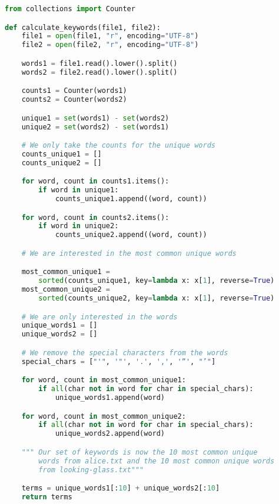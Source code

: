\documentclass{article}
\begin{document}
\begin{center}
\begin{minipage}{0.8\linewidth}
\begin{lstlisting}[language=Python]
from collections import Counter

def calculate_keywords(file1, file2):
    file1 = open(file1, "r", encoding="UTF-8")
    file2 = open(file2, "r", encoding="UTF-8")

    words1 = file1.read().lower().split()
    words2 = file2.read().lower().split()

    counts1 = Counter(words1)
    counts2 = Counter(words2)

    unique1 = set(words1) - set(words2)
    unique2 = set(words2) - set(words1)

    # We only take the counts for the unique words
    counts_unique1 = []
    counts_unique2 = []

    for word, count in counts1.items():
        if word in unique1:
            counts_unique1.append((word, count))

    for word, count in counts2.items():
        if word in unique2:
            counts_unique2.append((word, count))

    # We are interested in the most common unique words

    most_common_unique1 = 
        sorted(counts_unique1, key=lambda x: x[1], reverse=True)
    most_common_unique2 = 
        sorted(counts_unique2, key=lambda x: x[1], reverse=True)

    # We are only interested in the words
    unique_words1 = []
    unique_words2 = []

    # We remove the special characters from the words
    special_chars = ["'", '"', '.', ',', '“', "’"]

    for word, count in most_common_unique1:
        if all(char not in word for char in special_chars):
            unique_words1.append(word)

    for word, count in most_common_unique2:
        if all(char not in word for char in special_chars):
            unique_words2.append(word)

    """ Our set of keywords is now the 10 most common unique
        words from alice.txt and the 10 most common unique words 
        from looking-glass.txt"""

    terms = unique_words1[:10] + unique_words2[:10]
    return terms
\end{lstlisting}
\end{minipage}
\end{center}
\end{document}
